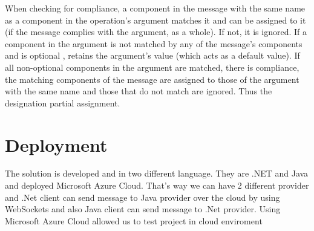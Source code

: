 When checking for compliance, a component in the message with the same name as a component in the operation’s argument matches it and
can be assigned to it (if the message complies with the argument, as a whole). If not, it is ignored. If a component in the argument
is not matched by any of the message’s components and is optional , retains the argument’s value (which acts as a default value).
If all non-optional  components in the argument are matched, there is compliance, the matching components of the message are
assigned to those of the argument with the same name and those that do not match are ignored. Thus the designation partial assignment.


\section{Deployment}
\label{section:deployment}

The solution is developed and in two different language. They are .NET and Java and deployed Microsoft Azure Cloud. That's way we can
have 2 different provider and .Net client can send message to Java provider over the cloud by using WebSockets and also Java client can
send message to .Net provider. Using Microsoft Azure Cloud allowed us to test project in cloud enviroment
